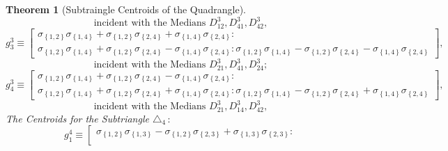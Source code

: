 \documentclass{unswthesis}
\newtheorem{theorem}{Theorem}
\begin{document}
\begin{theorem}[Subtraingle Centroids of the Quadrangle]
\begin{equation*}
\text{incident with the Medians }D_{12}^{3},D_{41}^{3},D_{42}^{3},
\end{equation*}%
\begin{equation*}
g_{3}^{3}\equiv \left[ 
\begin{array}{c}
\sigma _{\left\{ 1,2\right\} }\sigma _{\left\{ 1,4\right\} }+\sigma
_{\left\{ 1,2\right\} }\sigma _{\left\{ 2,4\right\} }+\sigma _{\left\{
1,4\right\} }\sigma _{\left\{ 2,4\right\} }: \\ 
\sigma _{\left\{ 1,2\right\} }\sigma _{\left\{ 1,4\right\} }+\sigma
_{\left\{ 1,2\right\} }\sigma _{\left\{ 2,4\right\} }-\sigma _{\left\{
1,4\right\} }\sigma _{\left\{ 2,4\right\} }:\sigma _{\left\{ 1,2\right\}
}\sigma _{\left\{ 1,4\right\} }-\sigma _{\left\{ 1,2\right\} }\sigma
_{\left\{ 2,4\right\} }-\sigma _{\left\{ 1,4\right\} }\sigma _{\left\{
2,4\right\} }%
\end{array}%
\right] ,
\end{equation*}%
\begin{equation*}
\text{incident with the Medians }D_{21}^{3},D_{41}^{3},D_{24}^{3};
\end{equation*}%
\begin{equation*}
g_{4}^{3}\equiv \left[ 
\begin{array}{c}
\sigma _{\left\{ 1,2\right\} }\sigma _{\left\{ 1,4\right\} }+\sigma
_{\left\{ 1,2\right\} }\sigma _{\left\{ 2,4\right\} }-\sigma _{\left\{
1,4\right\} }\sigma _{\left\{ 2,4\right\} }: \\ 
\sigma _{\left\{ 1,2\right\} }\sigma _{\left\{ 1,4\right\} }+\sigma
_{\left\{ 1,2\right\} }\sigma _{\left\{ 2,4\right\} }+\sigma _{\left\{
1,4\right\} }\sigma _{\left\{ 2,4\right\} }:\sigma _{\left\{ 1,2\right\}
}\sigma _{\left\{ 1,4\right\} }-\sigma _{\left\{ 1,2\right\} }\sigma
_{\left\{ 2,4\right\} }+\sigma _{\left\{ 1,4\right\} }\sigma _{\left\{
2,4\right\} }%
\end{array}%
\right] ,
\end{equation*}%
\begin{equation*}
\text{incident with the Medians }D_{21}^{3},D_{14}^{3},D_{42}^{3},
\end{equation*}%
The Centroids for the Subtriangle $\triangle _{4}\,:$%
\begin{equation*}
g_{1}^{4}\equiv \left[ 
\begin{array}{c}
\sigma _{\left\{ 1,2\right\} }\sigma _{\left\{ 1,3\right\} }-\sigma
_{\left\{ 1,2\right\} }\sigma _{\left\{ 2,3\right\} }+\sigma _{\left\{
1,3\right\} }\sigma _{\left\{ 2,3\right\} }: \\ 

\end{array}
\end{equation*}
\end{theorem}
\end{document}
